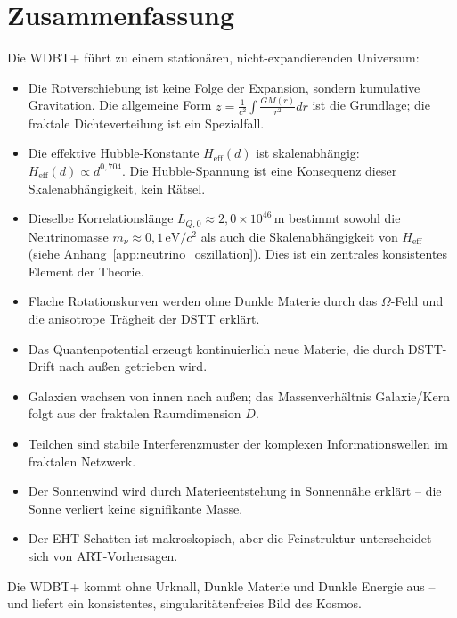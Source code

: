 \section{Zusammenfassung}
\label{sec:kosmo_zusammenfassung}

Die WDBT+ führt zu einem stationären, nicht-expandierenden Universum:

\begin{itemize}
    \item Die Rotverschiebung ist keine Folge der Expansion, sondern kumulative Gravitation. Die allgemeine Form \( z = \frac{1}{c^2} \int \frac{GM(r)}{r^2} dr \) ist die Grundlage; die fraktale Dichteverteilung ist ein Spezialfall.
    \item Die effektive Hubble-Konstante \( H_{\text{eff}}(d) \) ist skalenabhängig: \( H_{\text{eff}}(d) \propto d^{0,704} \). Die Hubble-Spannung ist eine Konsequenz dieser Skalenabhängigkeit, kein Rätsel.
    \item Dieselbe Korrelationslänge \( L_{Q,0} \approx 2{,}0 \times 10^{46} \, \text{m} \) bestimmt sowohl die Neutrinomasse \( m_\nu \approx 0,1 \, \text{eV}/c^2 \) als auch die Skalenabhängigkeit von \( H_{\text{eff}} \) (siehe Anhang~\ref{app:neutrino_oszillation}). Dies ist ein zentrales konsistentes Element der Theorie.
    \item Flache Rotationskurven werden ohne Dunkle Materie durch das \( \Omega \)-Feld und die anisotrope Trägheit der DSTT erklärt.
    \item Das Quantenpotential erzeugt kontinuierlich neue Materie, die durch DSTT-Drift nach außen getrieben wird.
    \item Galaxien wachsen von innen nach außen; das Massenverhältnis Galaxie/Kern folgt aus der fraktalen Raumdimension \( D \).
    \item Teilchen sind stabile Interferenzmuster der komplexen Informationswellen im fraktalen Netzwerk.
    \item Der Sonnenwind wird durch Materieentstehung in Sonnennähe erklärt – die Sonne verliert keine signifikante Masse.
    \item Der EHT-Schatten ist makroskopisch, aber die Feinstruktur unterscheidet sich von ART-Vorhersagen.
\end{itemize}

Die WDBT+ kommt ohne Urknall, Dunkle Materie und Dunkle Energie aus – und liefert ein konsistentes, singularitätenfreies Bild des Kosmos.